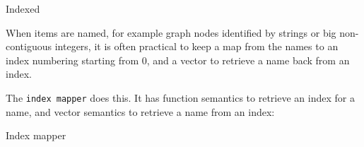 \categorycontents{}

\begin{algorithm}{Indexed}
\end{algorithm}

When items are named, for example graph nodes identified by strings or big
non-contiguous integers, it is often practical to keep a map from the
names to an index numbering starting from 0, and a vector to retrieve a name
back from an index.

The {\tt index mapper} does this.
It has function semantics to retrieve an index for a name,
and vector semantics to retrieve a name from an index:
\begin{algorithm}{Index mapper}
\end{algorithm}

\begin{sourceslandscape}
\end{sourceslandscape}
